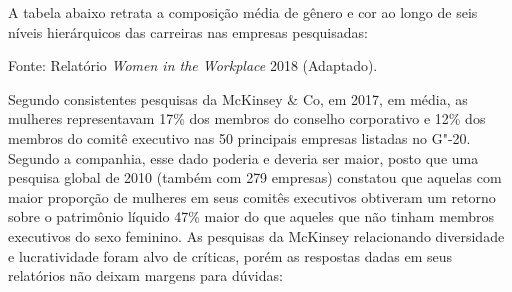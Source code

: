 A tabela abaixo retrata a composição média de gênero e cor ao longo de
seis níveis hierárquicos das carreiras nas empresas pesquisadas:


{\footnotesize{Fonte: Relatório \emph{Women in the Workplace} 2018 (Adaptado).}}

\bigskip

Segundo consistentes pesquisas da McKinsey \& Co, em 2017, em média, as
mulheres representavam 17\% dos membros do conselho corporativo e 12\%
dos membros do comitê executivo nas 50 principais empresas listadas no
G"-20. Segundo a companhia, esse dado poderia e deveria ser maior, posto
que uma pesquisa global de 2010 (também com 279 empresas) constatou que
aquelas com maior proporção de mulheres em seus comitês executivos
obtiveram um retorno sobre o patrimônio líquido 47\% maior do que
aqueles que não tinham membros executivos do sexo feminino. As pesquisas
da McKinsey relacionando diversidade e lucratividade foram alvo de
críticas, porém as respostas dadas em seus relatórios não deixam margens
para dúvidas:

